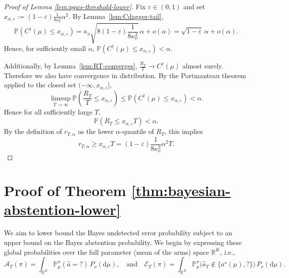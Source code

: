 \documentclass[10pt]{article}
\newcommand{\dd}{\mathrm{d}}
\theoremstyle{plain}
\begin{document}
\begin{proof}[Proof of Lemma \ref{lem:pgws-threshold-lower}]

Fix $\varepsilon\in(0,1)$ and set
$x_{\alpha,\varepsilon}
:=
(1-\varepsilon) \frac{1}{8\kappa_\nu^2} \alpha^2$. By Lemma~\ref{lem:Cdagger-tail},
\[
\mathbb P(C^\dagger(\mu)\le x_{\alpha,\varepsilon})
=
\kappa_\nu
\sqrt{8(1-\varepsilon) \frac{1}{8\kappa_\nu^2} }\,\alpha
+ o(\alpha)
=
\sqrt{1-\varepsilon}\,\alpha
+
o(\alpha).
\]
Hence, for sufficiently small $\alpha$,
$\mathbb P(C^\dagger(\mu)\le x_{\alpha,\varepsilon})
<
\alpha$.


Additionally, by Lemma~\ref{lem:RT-converges}, $\frac{R_T}{T}\to C^\dagger(\mu)$ almost surely.
Therefore we also have convergence in distribution. By the Portmanteau theorem applied to the closed set
\((-\infty,x_{\alpha,\varepsilon}]\),
\[
\limsup_{T\to\infty}
\mathbb P\left(\frac{R_T}{T}\le x_{\alpha,\varepsilon}\right)
\le
\mathbb P(C^\dagger(\mu)\le x_{\alpha,\varepsilon}) < \alpha.
\]
Hence for all sufficiently large $T$,
\[
\mathbb P(R_T\le x_{\alpha,\varepsilon}T)<\alpha.
\]
By the definition of $r_{T,\alpha}$ as the lower $\alpha$-quantile of $R_T$, this implies
\[
r_{T,\alpha}
\ge
x_{\alpha,\varepsilon}T
=
(1-\varepsilon) \frac{1}{8\kappa_\nu^2} \alpha^2T.  
\]

\end{proof}























\section{Proof of Theorem \ref{thm:bayesian-abstention-lower}} \label{pf_bayes_abs_lb}

We aim to lower bound the Bayes undetected error probability subject to an upper bound on the Bayes abstention probability. We begin by expressing these global probabilities over the full parameter (mean of the arms) space $\mathbb{R}^K$, i.e., 
$$\mathcal{A}_T(\pi) = \int_{\mathbb{R}^K} \mathbb{P}_\mu^\pi(\hat{a}=?)\,P_\nu(\dd\mu),\quad \mbox{and}\quad \mathcal{E}_T(\pi) = \int_{\mathbb{R}^K} \mathbb{P}_\mu^\pi\bigl(\hat{a}_T \notin \{a^\star(\mu), ?\}\bigr)\,P_\nu(\dd\mu).$$
\end{document}
